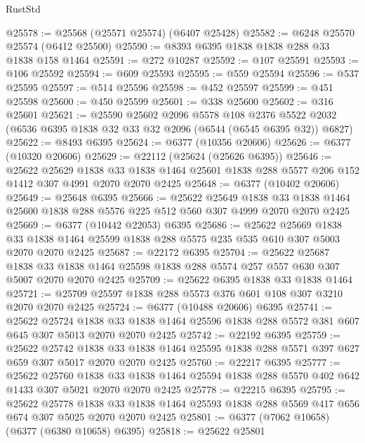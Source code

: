 \begin{lexlean}{RustStd}
\begin{coremodule}
@25578 := @25568 (@25571 @25574) (@6407 @25428)
@25582 := @6248 @25570 @25574 (@6412 @25500)
@25590 := @8393 @6395 @1838 @1838 @288 @33 @1838 @158 @1464
@25591 := @272 @10287
@25592 := @107 @25591
@25593 := @106 @25592
@25594 := @609 @25593
@25595 := @559 @25594
@25596 := @537 @25595
@25597 := @514 @25596
@25598 := @452 @25597
@25599 := @451 @25598
@25600 := @450 @25599
@25601 := @338 @25600
@25602 := @316 @25601
@25621 := @25590
    @25602
    @2096
    @5578
    @108
    @2376
    @5522
    @2032
    (@6536 @6395 @1838 @32 @33 @32 @2096 (@6544 (@6545 @6395 @32)) @6827)
@25622 := @8493 @6395
@25624 := @6377 (@10356 @20606)
@25626 := @6377 (@10320 @20606)
@25629 := @22112 (@25624 (@25626 @6395))
@25646 := @25622
    @25629
    @1838
    @33
    @1838
    @1464
    @25601
    @1838
    @288
    @5577
    @206
    @152
    @1412
    @307
    @4991
    @2070
    @2070
    @2425
@25648 := @6377 (@10402 @20606)
@25649 := @25648 @6395
@25666 := @25622
    @25649
    @1838
    @33
    @1838
    @1464
    @25600
    @1838
    @288
    @5576
    @225
    @512
    @560
    @307
    @4999
    @2070
    @2070
    @2425
@25669 := @6377 (@10442 @22053) @6395
@25686 := @25622
    @25669
    @1838
    @33
    @1838
    @1464
    @25599
    @1838
    @288
    @5575
    @235
    @535
    @610
    @307
    @5003
    @2070
    @2070
    @2425
@25687 := @22172 @6395
@25704 := @25622
    @25687
    @1838
    @33
    @1838
    @1464
    @25598
    @1838
    @288
    @5574
    @257
    @557
    @630
    @307
    @5007
    @2070
    @2070
    @2425
@25709 := @25622 @6395 @1838 @33 @1838 @1464
@25721 := @25709 @25597 @1838 @288 @5573 @376 @601 @108 @307 @3210 @2070 @2070 @2425
@25724 := @6377 (@10488 @20606) @6395
@25741 := @25622
    @25724
    @1838
    @33
    @1838
    @1464
    @25596
    @1838
    @288
    @5572
    @381
    @607
    @645
    @307
    @5013
    @2070
    @2070
    @2425
@25742 := @22192 @6395
@25759 := @25622
    @25742
    @1838
    @33
    @1838
    @1464
    @25595
    @1838
    @288
    @5571
    @397
    @627
    @659
    @307
    @5017
    @2070
    @2070
    @2425
@25760 := @22217 @6395
@25777 := @25622
    @25760
    @1838
    @33
    @1838
    @1464
    @25594
    @1838
    @288
    @5570
    @402
    @642
    @1433
    @307
    @5021
    @2070
    @2070
    @2425
@25778 := @22215 @6395
@25795 := @25622
    @25778
    @1838
    @33
    @1838
    @1464
    @25593
    @1838
    @288
    @5569
    @417
    @656
    @674
    @307
    @5025
    @2070
    @2070
    @2425
@25801 := @6377 (@7062 @10658) (@6377 (@6380 @10658) @6395)
@25818 := @25622
    @25801

\end{coremodule}
\end{lexlean}
